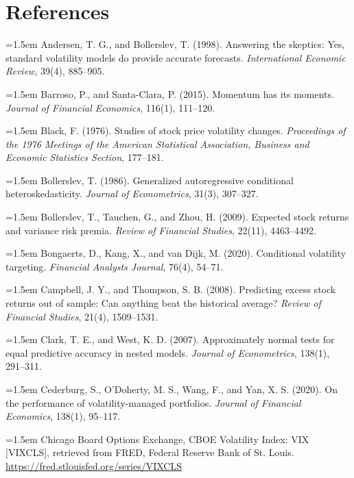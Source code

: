 \section*{References}
\begingroup\small\setlength{\parindent}{0pt}\raggedright
\hangindent=1.5em Andersen, T. G., and Bollerslev, T. (1998). Answering the skeptics: Yes, standard volatility models do provide accurate forecasts. \textit{International Economic Review}, 39(4), 885--905.\par\smallskip
\hangindent=1.5em Barroso, P., and Santa-Clara, P. (2015). Momentum has its moments. \textit{Journal of Financial Economics}, 116(1), 111--120.\par\smallskip
\hangindent=1.5em Black, F. (1976). Studies of stock price volatility changes. \textit{Proceedings of the 1976 Meetings of the American Statistical Association, Business and Economic Statistics Section}, 177--181.\par\smallskip
\hangindent=1.5em Bollerslev, T. (1986). Generalized autoregressive conditional heteroskedasticity. \textit{Journal of Econometrics}, 31(3), 307--327.\par\smallskip
\hangindent=1.5em Bollerslev, T., Tauchen, G., and Zhou, H. (2009). Expected stock returns and variance risk premia. \textit{Review of Financial Studies}, 22(11), 4463--4492.\par\smallskip
\hangindent=1.5em Bongaerts, D., Kang, X., and van Dijk, M. (2020). Conditional volatility targeting. \textit{Financial Analysts Journal}, 76(4), 54--71.\par\smallskip
\hangindent=1.5em Campbell, J. Y., and Thompson, S. B. (2008). Predicting excess stock returns out of sample: Can anything beat the historical average? \textit{Review of Financial Studies}, 21(4), 1509--1531.\par\smallskip
\hangindent=1.5em Clark, T. E., and West, K. D. (2007). Approximately normal tests for equal predictive accuracy in nested models. \textit{Journal of Econometrics}, 138(1), 291--311.\par\smallskip
\hangindent=1.5em Cederburg, S., O'Doherty, M. S., Wang, F., and Yan, X. S. (2020). On the performance of volatility-managed portfolios. \textit{Journal of Financial Economics}, 138(1), 95--117.\par\smallskip
\hangindent=1.5em Chicago Board Options Exchange, CBOE Volatility Index: VIX [VIXCLS], retrieved from FRED, Federal Reserve Bank of St. Louis. \url{https://fred.stlouisfed.org/series/VIXCLS}\par\smallskip

